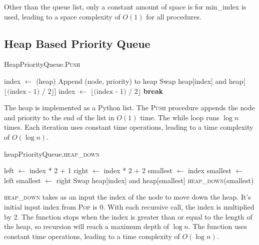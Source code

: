 \documentclass[12pt]{article}
\begin{document}
Other than the queue list, only a constant amount of space is for min\_index
is used, leading to a space complexity of $O(1)$ for all procedures.

\newpage

\subsection{Heap Based Priority Queue}

\begin{algorithm}[H]
    \caption{HeapPriorityQueue.\textsc{Push}}
    \begin{algorithmic}[1]
        \State index $\gets$ (heap)
        \State Append (node, priority) to heap
         
                \State Swap heap[index] and heap[$\lfloor \text{(index - 1) / 2} \rfloor$]
                \State index $\gets$ $\lfloor \text{(index - 1) / 2} \rfloor$
            \Else
                \State \textbf{break}
            \EndIf
        \EndWhile
    \end{algorithmic}
\end{algorithm}

The heap is implemented as a Python list. The \textsc{Push} procedure appends the
node and priority to the end of the list in $O(1)$ time. The while loop runs $\log{n}$
times. Each iteration uses constant time operations, leading to a time complexity
of $O(\log{n})$.

\begin{algorithm}[H]
    \caption{heapPriorityQueue.\textsc{heap\_down}}
    \begin{algorithmic}[1]
        \State left $\gets$ index * 2 + 1
        \State right $\gets$ index * 2 + 2
        \State smallest $\gets$ index
            \State smallest $\gets$ left
        \EndIf
            \State smallest $\gets$ right
        \EndIf
            \State Swap heap[index] and heap[smallest]
            \State \textsc{heap\_down}(smallest)
        \EndIf
    \end{algorithmic}
\end{algorithm}

\textsc{heap\_down} takes as an input the index of the node to move down the heap.
It's initial input index from \textsc{Pop} is 0. With each recursive call,
the index is multiplied by 2. The function stops when the index is greater than
or equal to the length of the heap, so recursion will reach a maximum depth of
$\log{n}$. The function uses constant time operations, leading to a time complexity
of $O(\log{n})$.
\end{document}
